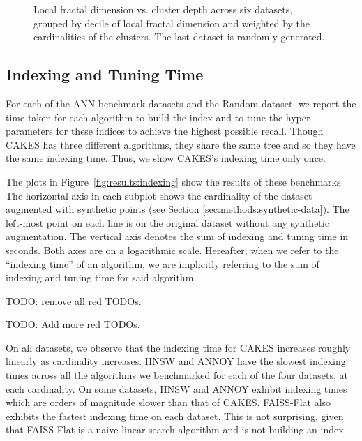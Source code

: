\begin{figure}
\begin{subfigure}[b]{0.47\textwidth}
        \label{fig:results:random-lfd}
    \end{subfigure}
    \vspace{1em}
    \caption{Local fractal dimension vs. cluster depth across six datasets, grouped by decile of local fractal dimension and weighted by the cardinalities of the clusters.
    The last dataset is randomly generated.}
    \label{fig:results:lfd-plots}
\end{figure}


\subsection{Indexing and Tuning Time}
\label{sec:results:indexing-and-tuning-time}

For each of the ANN-benchmark datasets and the Random dataset, we report the time taken for each algorithm to build the index and to tune the hyper-parameters for these indices to achieve the highest possible recall.
Though CAKES has three different algorithms, they share the same tree and so they have the same indexing time.
Thus, we show CAKES's indexing time only once.

The plots in Figure~\ref{fig:results:indexing} show the results of these benchmarks.
The horizontal axis in each subplot shows the cardinality of the dataset augmented with synthetic points (see Section \ref{sec:methods:synthetic-data}).
The left-most point on each line is on the original dataset without any synthetic augmentation.
The vertical axis denotes the sum of indexing and tuning time in seconds.
Both axes are on a logarithmic scale.
Hereafter, when we refer to the ``indexing time'' of an algorithm, we are implicitly referring to the sum of indexing and tuning time for said algorithm.

{\color{red} TODO: remove all red TODOs.}

{\color{red} TODO: Add more red TODOs.}

On all datasets, we observe that the indexing time for CAKES increases roughly linearly as cardinality increases.
HNSW and ANNOY have the slowest indexing times across all the algorithms we benchmarked for each of the four datasets, at each cardinality. 
On some datasets, HNSW and ANNOY exhibit indexing times which are orders of magnitude slower than that of CAKES.
FAISS-Flat also exhibits the fastest indexing time on each dataset. 
This is not surprising, given that FAISS-Flat is a naive linear search algorithm and is not building an index.

